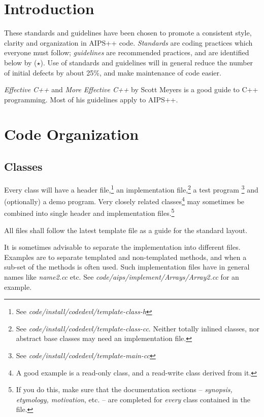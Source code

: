 \section {Introduction}
These standards and guidelines have been chosen to promote a consistent
style, clarity and organization in AIPS++ code.  {\em Standards} are coding
practices which everyone must follow; {\em guidelines} are recommended
practices, and are identified below by ($\star$).
\bmar Use of standards and guidelines will in general reduce the number of
initial defects by about 25\%, and make maintenance of code easier.\bmar

{\it Effective C++} and {\it More Effective C++} \bmar 
by Scott Meyers is a good guide to C++ programming.  
Most of his guidelines apply to AIPS++. 
\section {Code Organization}
\subsection {Classes} Every class will have a header file,\footnote{See {\em
code/install/codedevl/template-class-h}} an implementation file,\footnote
{See {\em code/install/codedevl/template-class-cc}. Neither totally inlined
classes, nor abstract base classes may need an implementation file.} a test
program \footnote {See {\em code/install/codedevl/template-main-cc}} 
and (optionally) a demo program.  Very closely related classes\footnote {A
good example is a read-only class, and a read-write class derived from it.}
may sometimes be combined into single header and implementation
files.\footnote {If you do this, make sure that the documentation sections --
{\em synopsis, etymology, motivation}, etc. -- are completed for {\em every}
class contained in the file.}

\bmar All files shall follow the latest template file as a guide for the
standard layout.

It is sometimes advisable to separate the implementation into different
files. Examples are to separate templated and non-templated methods, and when
a sub-set of the methods is often used. Such implementation files have in
general names like {\it name2.cc} etc. See {\it
code/aips/implement/Arrays/Array2.cc} for an example.

